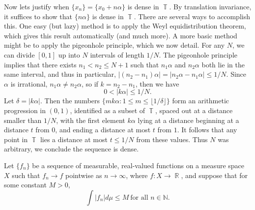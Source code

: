 \documentclass[answers]{exam}
\DeclareMathOperator{\RR}{\mathbb{R}}
\DeclareMathOperator{\TT}{\mathbb{T}}
\theoremstyle{problemstyle}
\newcommand{\1}[1]{\textbf{1}_{\left[#1\right]}} %
\begin{document}
\begin{questions}
\begin{solution}
	Now lets justify when $\{ x_n \} = \{ x_0 + n \alpha \}$ is dense in $\TT$. By translation invariance, it suffices to show that $\{ n \alpha \}$ is dense in $\TT$. There are several ways to accomplish this. One easy (but lazy) method is to apply the Weyl equidistribution theorem, which gives this result automatically (and much more). A more basic method might be to apply the pigeonhole principle, which we now detail. For any $N$, we can divide $[0,1]$ up into $N$ intervals of length $1/N$. The pigeonhole principle implies that there exists $n_1 < n_2 \leq N + 1$ such that $n_1 \alpha$ and $n_2 \alpha$ both lie in the same interval, and thus in particular, $|(n_2 - n_1) \alpha| = |n_2 \alpha - n_1 \alpha| \leq 1/N$. Since $\alpha$ is irrational, $n_1 \alpha \neq n_2 \alpha$, so if $k = n_2 - n_1$, then we have
	\[ 0 < |k \alpha| \leq 1/N. \]
	Let $\delta = |k \alpha|$. Then the numbers $\{ m k\alpha : 1 \leq m \leq \lfloor 1/\delta \rfloor \}$ form an arithmetic progression in $(0,1)$, identified as a subset of $\TT$, spaced out at a distance smaller than $1/N$, with the first element $k \alpha$ lying at a distance beginning at a distance $t$ from $0$, and ending a distance at most $t$ from $1$. It follows that any point in $\TT$ lies a distance at most $t \leq 1/N$ from these values. Thus $N$ was arbitrary, we conclude the sequence is dense.
\end{solution}

\question Let $\{ f_n \}$ be a sequence of measurable, real-valued functions on a measure space $X$ such that $f_n \to f$ pointwise as $n \to \infty$, where $f: X \to \RR$, and suppose that for some constant $M > 0$,
%
\[ \int |f_n| d\mu \leq M\ \text{for all $n \in \mathbb{N}$}. \]
\end{questions}
\end{document}
